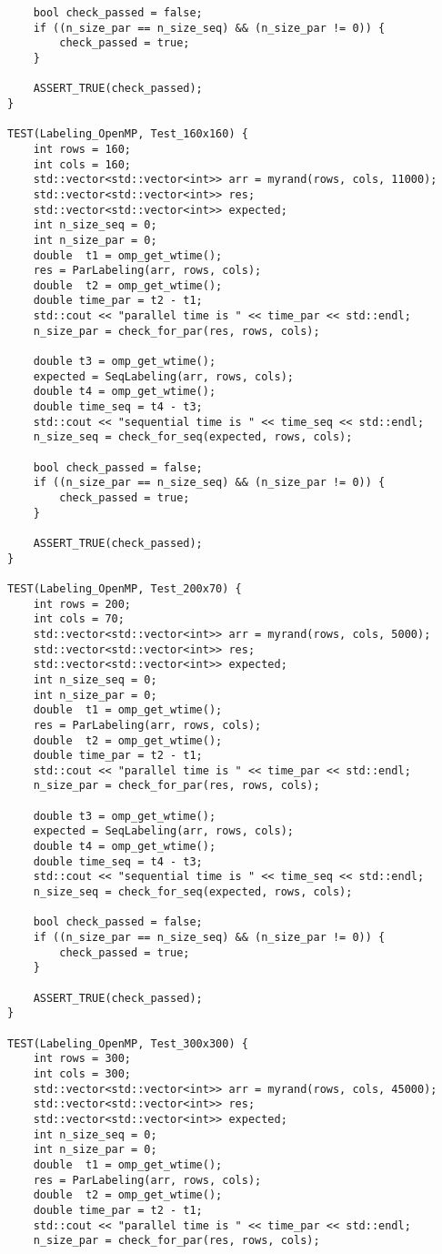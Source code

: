 \documentclass{report}
\begin{document}
\begin{lstlisting}
    bool check_passed = false;
    if ((n_size_par == n_size_seq) && (n_size_par != 0)) {
        check_passed = true;
    }

    ASSERT_TRUE(check_passed);
}

TEST(Labeling_OpenMP, Test_160x160) {
    int rows = 160;
    int cols = 160;
    std::vector<std::vector<int>> arr = myrand(rows, cols, 11000);
    std::vector<std::vector<int>> res;
    std::vector<std::vector<int>> expected;
    int n_size_seq = 0;
    int n_size_par = 0;
    double  t1 = omp_get_wtime();
    res = ParLabeling(arr, rows, cols);
    double  t2 = omp_get_wtime();
    double time_par = t2 - t1;
    std::cout << "parallel time is " << time_par << std::endl;
    n_size_par = check_for_par(res, rows, cols);

    double t3 = omp_get_wtime();
    expected = SeqLabeling(arr, rows, cols);
    double t4 = omp_get_wtime();
    double time_seq = t4 - t3;
    std::cout << "sequential time is " << time_seq << std::endl;
    n_size_seq = check_for_seq(expected, rows, cols);

    bool check_passed = false;
    if ((n_size_par == n_size_seq) && (n_size_par != 0)) {
        check_passed = true;
    }

    ASSERT_TRUE(check_passed);
}

TEST(Labeling_OpenMP, Test_200x70) {
    int rows = 200;
    int cols = 70;
    std::vector<std::vector<int>> arr = myrand(rows, cols, 5000);
    std::vector<std::vector<int>> res;
    std::vector<std::vector<int>> expected;
    int n_size_seq = 0;
    int n_size_par = 0;
    double  t1 = omp_get_wtime();
    res = ParLabeling(arr, rows, cols);
    double  t2 = omp_get_wtime();
    double time_par = t2 - t1;
    std::cout << "parallel time is " << time_par << std::endl;
    n_size_par = check_for_par(res, rows, cols);

    double t3 = omp_get_wtime();
    expected = SeqLabeling(arr, rows, cols);
    double t4 = omp_get_wtime();
    double time_seq = t4 - t3;
    std::cout << "sequential time is " << time_seq << std::endl;
    n_size_seq = check_for_seq(expected, rows, cols);

    bool check_passed = false;
    if ((n_size_par == n_size_seq) && (n_size_par != 0)) {
        check_passed = true;
    }

    ASSERT_TRUE(check_passed);
}

TEST(Labeling_OpenMP, Test_300x300) {
    int rows = 300;
    int cols = 300;
    std::vector<std::vector<int>> arr = myrand(rows, cols, 45000);
    std::vector<std::vector<int>> res;
    std::vector<std::vector<int>> expected;
    int n_size_seq = 0;
    int n_size_par = 0;
    double  t1 = omp_get_wtime();
    res = ParLabeling(arr, rows, cols);
    double  t2 = omp_get_wtime();
    double time_par = t2 - t1;
    std::cout << "parallel time is " << time_par << std::endl;
    n_size_par = check_for_par(res, rows, cols);


\end{lstlisting}
\end{document}
